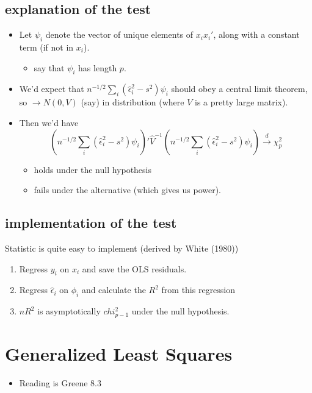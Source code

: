 \documentclass[11pt]{article}
\begin{document}
\subsection{explanation of the test}
\label{sec-2-3}

\begin{itemize}
\item Let $\psi_i$ denote the vector of unique elements of $x_ix_i'$,
       along with a constant term (if not in $x_i$).
\begin{itemize}
\item say that $\psi_i$ has length $p$.
\end{itemize}
\item We'd expect that $n^{-1/2} \sum_i (\hat\epsilon_i^2 - s^2)
       \psi_i$ should obey a central limit theorem, so $\to N(0, V)$
       (say) in distribution (where $V$ is a pretty large matrix).
\item Then we'd have 
       \[\left(n^{-1/2} \sum_i (\hat\epsilon_i^2 - s^2)\psi_i\right)'
       \hat V^{-1} \left(n^{-1/2} \sum_i (\hat\epsilon_i^2 -
       s^2)\psi_i\right) \xrightarrow{d} \chi_p^2\]
\begin{itemize}
\item holds under the null hypothesis
\item fails under the alternative (which gives us power).
\end{itemize}
\end{itemize}
\subsection{implementation of the test}
\label{sec-2-4}

     Statistic is quite easy to implement (derived by White (1980))

\begin{enumerate}
\item Regress $y_i$ on $x_i$ and save the OLS residuals.
\item Regress $\hat\epsilon_i$ on $\phi_i$ and calculate the $R^2$
        from this regression
\item $n R^2$ is asymptotically $chi^2_{p-1}$ under the null
        hypothesis.
\end{enumerate}
\section{Generalized Least Squares}
\label{sec-3}

\begin{itemize}
\item Reading is Greene 8.3
\end{itemize}
\end{document}
